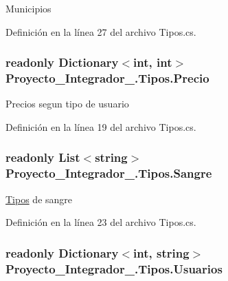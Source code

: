 Municipios 



Definición en la línea 27 del archivo Tipos.\-cs.

\hypertarget{class_proyecto___integrador__3_1_1_tipos_afe593c0c3c57dd7bf5133d57974f1ed3}{
\subsubsection[{Precio}]{\setlength{\rightskip}{0pt plus 5cm}readonly Dictionary$<$int, int$>$ Proyecto\-\_\-\-Integrador\-\_.\-Tipos.\-Precio\hspace{0.3cm}{\ttfamily [static]}}}\label{class_proyecto___integrador__3_1_1_tipos_afe593c0c3c57dd7bf5133d57974f1ed3}


Precios segun tipo de usuario 



Definición en la línea 19 del archivo Tipos.\-cs.

\hypertarget{class_proyecto___integrador__3_1_1_tipos_a25b8a490a180214246eedb322ed962a2}{
\subsubsection[{Sangre}]{\setlength{\rightskip}{0pt plus 5cm}readonly List$<$string$>$ Proyecto\-\_\-\-Integrador\-\_.\-Tipos.\-Sangre\hspace{0.3cm}{\ttfamily [static]}}}\label{class_proyecto___integrador__3_1_1_tipos_a25b8a490a180214246eedb322ed962a2}


\hyperlink{class_proyecto___integrador__3_1_1_tipos}{Tipos} de sangre 



Definición en la línea 23 del archivo Tipos.\-cs.

\hypertarget{class_proyecto___integrador__3_1_1_tipos_ae053b8caca38c487e2d9d2635b154c88}{
\subsubsection[{Usuarios}]{\setlength{\rightskip}{0pt plus 5cm}readonly Dictionary$<$int, string$>$ Proyecto\-\_\-\-Integrador\-\_.\-Tipos.\-Usuarios\hspace{0.3cm}{\ttfamily [static]}}}\label{class_proyecto___integrador__3_1_1_tipos_ae053b8caca38c487e2d9d2635b154c88}


